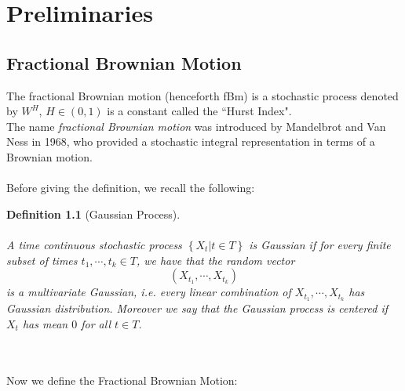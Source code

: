 \documentclass[a4paper,italian,11pt]{book}
\theoremstyle{plain}
\newtheorem{definition}{Definition}
\theoremstyle{remark}
\theoremstyle{plain}
\begin{document}
\chapter{Preliminaries}

\section{Fractional Brownian Motion}

The fractional Brownian motion (henceforth fBm) is a stochastic process denoted by $W^H$, $H\in (0,1)$ is a constant called the ``Hurst Index". \\
The name \textit{fractional Brownian motion} was introduced by Mandelbrot and Van Ness in 1968, who provided a stochastic integral representation in terms of a Brownian motion. 
\\
\\
Before giving the definition, we recall the following:

\begin{definition}[Gaussian Process]
\\\
\\
A time continuous stochastic process $\left\{ X_t | t\in T\right\}$ is Gaussian if for every finite subset of times $t_1,\cdots , t_k\in T$, we have that the random vector 
$$(X_{t_1},\cdots, X_{t_k})$$
is a multivariate Gaussian, i.e. every linear combination of $X_{t_1},\cdots, X_{t_k}$ has Gaussian distribution. 
Moreover we say that the Gaussian process is \textit{centered} if $X_{t}$ has mean $0$ for all $t\in T$.
\end{definition}
\\\
\\
Now we define the Fractional Brownian Motion:
\end{document}

